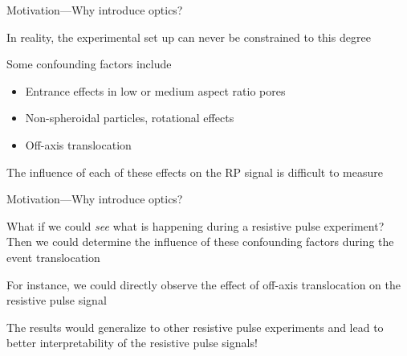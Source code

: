 

\begin{frame}[c]{Motivation---Why introduce optics?}
	
	
	
	In reality, the experimental set up can never be constrained to this degree
	
	Some confounding factors include
	
	\begin{itemize}
		\item Entrance effects in low or medium aspect ratio pores
		\item Non-spheroidal particles, rotational effects
		\item Off-axis translocation
	\end{itemize}
	
	The influence of each of these effects on the RP signal is difficult to measure

\end{frame}





\begin{frame}[c]{Motivation---Why introduce optics?}
	
	What if we could \textit{see} what is happening during a resistive pulse experiment? Then we could determine the influence of these confounding factors during the event translocation \\
	
	\vspace{.2in}
	
	For instance, we could directly observe the effect of off-axis translocation on the resistive pulse signal
	
	\vspace{.2in}
	
	The results would generalize to other resistive pulse experiments and lead to better interpretability of the resistive pulse signals! \\

\end{frame}



